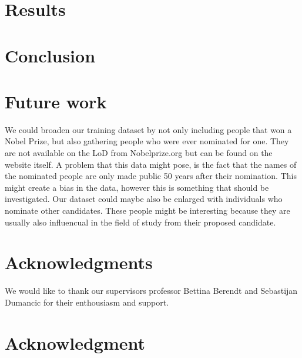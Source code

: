 \documentclass[11pt,journal,compsoc]{IEEEtran}
\begin{document}




\section{Results}
\label{sec:results}

\section{Conclusion}

\section{Future work}

We could broaden our training dataset by not only including people that won a Nobel Prize, but also gathering people who were ever nominated for one. They are not available on the LoD from Nobelprize.org but can be found on the website itself\cite{nominated}. A problem that this data might pose, is the fact that the names of the nominated people are only made public 50 years after their nomination.
This might create a bias in the data, however this is something that should be investigated.
Our dataset could maybe also be enlarged with individuals who nominate other candidates. These people might be interesting because they are usually also influencual in the field of study from their proposed candidate.



\ifCLASSOPTIONcompsoc
  \section*{Acknowledgments}
  We would like to thank our supervisors professor Bettina Berendt and Sebastijan Dumancic for their enthousiasm and support.
\else
  \section*{Acknowledgment}
\fi

\end{document}
